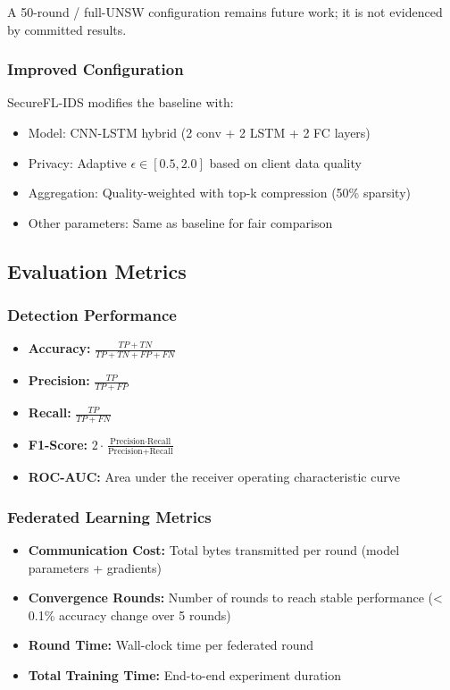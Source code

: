 A 50-round / full-UNSW configuration remains future work; it is not evidenced by committed results.


\subsubsection{Improved Configuration}

SecureFL-IDS modifies the baseline with:

\begin{itemize}
    \item Model: CNN-LSTM hybrid (2 conv + 2 LSTM + 2 FC layers)
    \item Privacy: Adaptive $\epsilon \in [0.5, 2.0]$ based on client data quality
    \item Aggregation: Quality-weighted with top-k compression (50\% sparsity)
    \item Other parameters: Same as baseline for fair comparison
\end{itemize}

\subsection{Evaluation Metrics}

\subsubsection{Detection Performance}

\begin{itemize}
    \item \textbf{Accuracy:} $\frac{TP + TN}{TP + TN + FP + FN}$
    \item \textbf{Precision:} $\frac{TP}{TP + FP}$
    \item \textbf{Recall:} $\frac{TP}{TP + FN}$
    \item \textbf{F1-Score:} $2 \cdot \frac{\text{Precision} \cdot \text{Recall}}{\text{Precision} + \text{Recall}}$
    \item \textbf{ROC-AUC:} Area under the receiver operating characteristic curve
\end{itemize}

\subsubsection{Federated Learning Metrics}

\begin{itemize}
    \item \textbf{Communication Cost:} Total bytes transmitted per round (model parameters + gradients)
    \item \textbf{Convergence Rounds:} Number of rounds to reach stable performance (< 0.1\% accuracy change over 5 rounds)
    \item \textbf{Round Time:} Wall-clock time per federated round
    \item \textbf{Total Training Time:} End-to-end experiment duration
\end{itemize}

